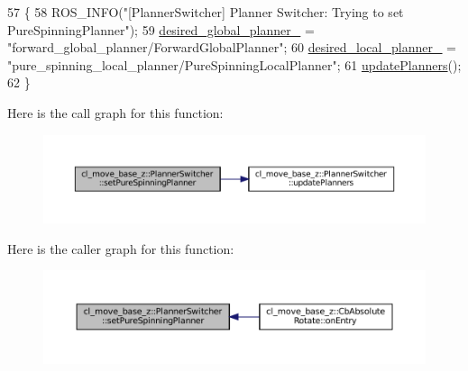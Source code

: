 \begin{DoxyCode}
57 \{
58   ROS\_INFO(\textcolor{stringliteral}{"[PlannerSwitcher] Planner Switcher: Trying to set PureSpinningPlanner"});
59   \hyperlink{classcl__move__base__z_1_1PlannerSwitcher_aef047d3778b2993c1df146bbad43e03d}{desired\_global\_planner\_} = \textcolor{stringliteral}{"forward\_global\_planner/ForwardGlobalPlanner"};
60   \hyperlink{classcl__move__base__z_1_1PlannerSwitcher_a6cbf65f11bb69125f913caaabdf7b4cf}{desired\_local\_planner\_} = \textcolor{stringliteral}{"pure\_spinning\_local\_planner/PureSpinningLocalPlanner"};
61   \hyperlink{classcl__move__base__z_1_1PlannerSwitcher_a146641f63aea3185daab4c5cbb789550}{updatePlanners}();
62 \}
\end{DoxyCode}
Here is the call graph for this function\+:
\nopagebreak
\begin{figure}[H]
\begin{center}
\leavevmode
\includegraphics[width=350pt]{classcl__move__base__z_1_1PlannerSwitcher_a0accdff89d7858658c1835f06b53786f_cgraph}
\end{center}
\end{figure}
Here is the caller graph for this function\+:
\nopagebreak
\begin{figure}[H]
\begin{center}
\leavevmode
\includegraphics[width=350pt]{classcl__move__base__z_1_1PlannerSwitcher_a0accdff89d7858658c1835f06b53786f_icgraph}
\end{center}
\end{figure}
\mbox{\label{classcl__move__base__z_1_1PlannerSwitcher_a99e5ec5c0529dab7b528c1e0d9e36012}} 
